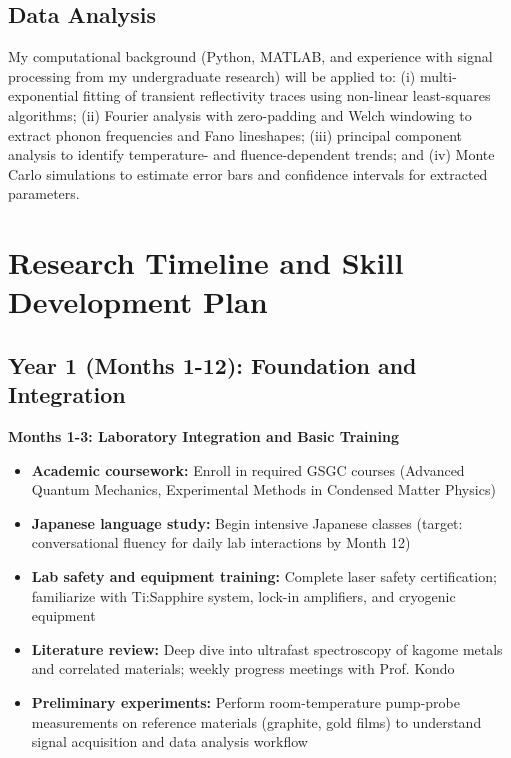 \documentclass[12pt,a4paper]{article}
\begin{document}
\subsection{Data Analysis}
My computational background (Python, MATLAB, and experience with signal processing from my undergraduate research) will be applied to: (i) multi-exponential fitting of transient reflectivity traces using non-linear least-squares algorithms; (ii) Fourier analysis with zero-padding and Welch windowing to extract phonon frequencies and Fano lineshapes; (iii) principal component analysis to identify temperature- and fluence-dependent trends; and (iv) Monte Carlo simulations to estimate error bars and confidence intervals for extracted parameters.

\section{Research Timeline and Skill Development Plan}

\subsection{Year 1 (Months 1-12): Foundation and Integration}

\textbf{Months 1-3: Laboratory Integration and Basic Training}
\begin{itemize}
    \item \textbf{Academic coursework:} Enroll in required GSGC courses (Advanced Quantum Mechanics, Experimental Methods in Condensed Matter Physics)
    \item \textbf{Japanese language study:} Begin intensive Japanese classes (target: conversational fluency for daily lab interactions by Month 12)
    \item \textbf{Lab safety and equipment training:} Complete laser safety certification; familiarize with Ti:Sapphire system, lock-in amplifiers, and cryogenic equipment
    \item \textbf{Literature review:} Deep dive into ultrafast spectroscopy of kagome metals and correlated materials; weekly progress meetings with Prof. Kondo
    \item \textbf{Preliminary experiments:} Perform room-temperature pump-probe measurements on reference materials (graphite, gold films) to understand signal acquisition and data analysis workflow
\end{itemize}
\end{document}
